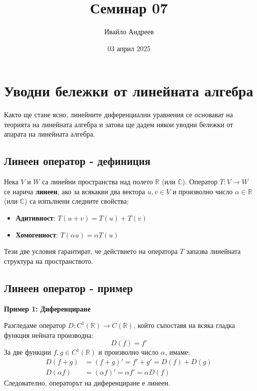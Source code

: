 \documentclass{scrartcl}
\title{Семинар 07}
\author{Ивайло Андреев}
\date{03 април 2025}
\begin{document}
\maketitle  %

\section{Уводни бележки от линейната алгебра}

Както ще стане ясно, линейните диференциални уравнения се основават на теорията на линейната алгебра и затова ще дадем някои уводни бележки от апарата на линейната алгебра.

\subsection{Линеен оператор - дефиниция}

Нека $V$ и $W$ са линейни пространства над полето $\mathbb{R}$ (или $\mathbb{C}$). Оператор $T: V \to W$ се нарича \textbf{линеен}, ако за всякакви два вектора $u, v \in V$ и произволно число $\alpha \in \mathbb{R}$ (или $\mathbb{C}$) са изпълнени следните свойства:

\begin{itemize}
    \item \textbf{Адитивност}: $T(u + v) = T(u) + T(v)$
    \item \textbf{Хомогенност}: $T(\alpha u) = \alpha T(u)$
\end{itemize}

Тези две условия гарантират, че действието на оператора $T$ запазва линейната структура на пространството.

\subsection{Линеен оператор - пример}

\textbf{Пример 1: Диференциране}

Разгледаме оператор $D: C^1(\mathbb{R}) \to C(\mathbb{R})$, който съпоставя на всяка гладка функция нейната производна:
\[ D(f) = f' \]
За две функции $f, g \in C^1(\mathbb{R})$ и произволно число $\alpha$, имаме:
\begin{align*}
    D(f + g) &= (f + g)' = f' + g' = D(f) + D(g) \\
    D(\alpha f) &= (\alpha f)' = \alpha f' = \alpha D(f)
\end{align*}
Следователно, операторът на диференциране е линеен.
\end{document}

